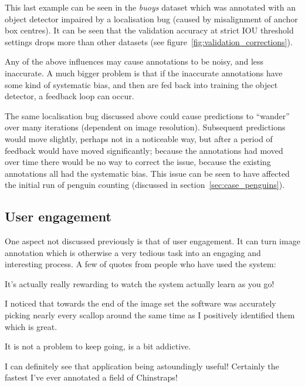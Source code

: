 This last example can be seen in the \emph{buoys} dataset which was annotated with an object detector impaired by a localisation bug (caused by misalignment of anchor box centres). It can be seen that the validation accuracy at strict \gls{IOU} threshold settings drops more than other datasets (see figure~\ref{fig:validation_corrections}).   

Any of the above influences may cause annotations to be noisy, and less inaccurate. A much bigger problem is that if the inaccurate annotations have some kind of systematic bias, and then are fed back into training the object detector, a feedback loop can occur. 

The same localisation bug discussed above could cause predictions to ``wander'' over many iterations (dependent on image resolution). Subsequent predictions would move slightly, perhaps not in a noticeable way, but after a period of feedback would have moved significantly; because the annotations had moved over time there would be no way to correct the issue, because the existing annotations all had the systematic bias. This issue can be seen to have affected the initial run of penguin counting (discussed in section~\ref{sec:case_penguins}).   

\subsection{User engagement}
\label{sec:engagement}

One aspect not discussed previously is that of user engagement. It can turn image annotation which is otherwise a very tedious task into an engaging and interesting process. A few of quotes from people who have used the system:

\begin{displayquote}
It's actually really rewarding to watch the system actually learn as you go!
\end{displayquote}

\begin{displayquote}
I noticed that towards the end of the image set the software was accurately picking nearly every scallop around the same time as I positively identified them which is great.
\end{displayquote}

\begin{displayquote}
 It is not a problem to keep going, is a bit addictive.
\end{displayquote}

\begin{displayquote}
I can definitely see that application being astoundingly useful! Certainly the fastest I've ever annotated a field of Chinstraps! 
\end{displayquote}

